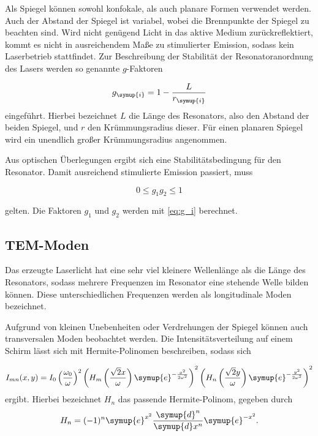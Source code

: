 Als Spiegel können sowohl konfokale, als auch planare Formen verwendet werden. Auch der Abstand der Spiegel ist variabel, wobei die Brennpunkte der Spiegel zu beachten sind.
Wird nicht genügend Licht in das aktive Medium zurückreflektiert, kommt es nicht in ausreichendem Maße zu stimulierter Emission, sodass kein Laserbetrieb stattfindet.
Zur Beschreibung der Stabilität der Resonatoranordnung des Lasers werden so genannte $g$-Faktoren

\begin{equation}
    g_{\symup{i}} = 1 - \frac{L}{r_{\symup{i}}}
    \label{eq:g_i}
\end{equation}
eingeführt. Hierbei bezeichnet $L$ die Länge des Resonators, also den Abstand der beiden Spiegel, und $r$ den Krümmungsradius dieser. Für einen planaren Spiegel wird ein unendlich großer
Krümmungsradius angenommen.

Aus optischen Überlegungen ergibt sich eine Stabilitätsbedingung für den Resonator. Damit ausreichend stimulierte Emission passiert, muss

\begin{equation}
    0 ≤ g_1g_2 ≤ 1
    \label{eq:g1g2}
\end{equation}

gelten. Die Faktoren $g_1$ und $g_2$ werden mit \eqref{eq:g_i} berechnet.

\subsection{TEM-Moden}
Das erzeugte Laserlicht hat eine sehr viel kleinere Wellenlänge als die Länge des Resonators, sodass mehrere Frequenzen im Resonator eine stehende Welle bilden können. Diese unterschiedlichen
Frequenzen werden als longitudinale Moden bezeichnet. 

Aufgrund von kleinen Unebenheiten oder Verdrehungen der Spiegel können auch transversalen Moden beobachtet werden. Die Intensitätsverteilung auf einem Schirm lässt sich mit Hermite-Polinomen beschreiben,
sodass sich

\begin{equation}
    I_{mn}(x,y) = I_0\left(\frac{\omega_0}{\omega}\right)^2\left(H_m\left(\frac{\sqrt{2}x}{\omega}\right)\symup{e}^{-\frac{x^2}{2\omega^2}}\right)^2\left(H_n\left(\frac{\sqrt{2}y}{\omega}\right)\symup{e}^{-\frac{y^2}{2\omega^2}}\right)^2
    \label{eq:I_mn}
\end{equation}
ergibt. Hierbei bezeichnet $H_n$ das passende Hermite-Polinom, gegeben durch
\begin{equation*}
    H_n = (-1)^{n}\symup{e}^{x^2}\frac{\symup{d}^n}{\symup{d}x^n}\symup{e}^{-x^2}.
\end{equation*}

